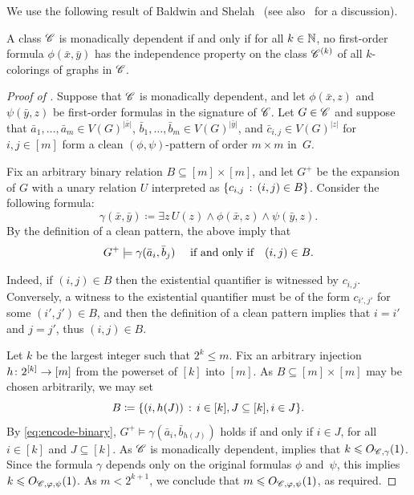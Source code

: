 We use the following result of Baldwin and Shelah~\cite[Theorem~8.1.8]{BS1985monadic} (see also~\cite[Theorem~2.58 and Proposition~2.65]{wojtekthesis} for a discussion).
\begin{theorem}\label{thm:bs}
A class $\mathscr C$ is monadically dependent if and only if 
for all $k\in\mathbb N$, no first-order formula $\phi(\bar x,\bar y)$ has the independence property on the class $\mathscr C^{(k)}$ of all $k$-colorings of graphs in $\mathscr C$.    
\end{theorem}

\begin{proof}[Proof of ]
    Suppose that $\mathscr C$ is monadically dependent, and let $\phi(\bar x,z)$ and $\psi(\bar y,z)$ be first-order formulas in the signature of $\mathscr C$.
     Let $G\in\mathscr C$ and suppose that $\bar a_1,\ldots,\bar a_m\in V(G)^{|\bar x|}$, $\bar b_1,\ldots,\bar b_m\in V(G)^{|\bar y|}$, and $\bar c_{i,j}\in V(G)^{|z|}$ for $i,j\in[m]$
       form a clean $(\phi,\psi)$-pattern of order $m\times m$ in~$G$.
    
    Fix an arbitrary binary relation $B\subseteq [m]\times [m]$,
and let $G^+$ be the expansion of $G$ with a unary relation $U$ 
interpreted as $\{c_{i,j} \,:\, (i,j)\in B \}$.
 Consider the following formula:
 $$\gamma(\bar x,\bar y)\coloneqq \exists z\, U(z)\land\phi(\bar x,z)\land \psi(\bar y,z).$$
 By the definition of a clean pattern, the above imply that
 \begin{align}\label{eq:encode-binary}
 G^+\models \gamma(\bar a_i,\bar b_j)\text{ \quad if and only if\quad} (i,j)\in B.   
 \end{align}

 Indeed, if $(i,j)\in B$ then the existential quantifier is witnessed by $c_{i,j}$.
 Conversely, a witness to the existential quantifier must be of the form $c_{i',j'}$ for some $(i',j')\in B$, and then the definition of a clean pattern implies that
 $i=i'$ and $j=j'$, thus $(i,j)\in B$.



Let $k$ be the largest integer such that $2^k\le m$. 
Fix an arbitrary injection $h\colon 2^{[k]}\to [m]$ from the powerset of $[k]$ into $[m]$.
As $B\subseteq[m]\times[m]$ may be chosen arbitrarily,
we may set $$B\coloneqq \{(i,h(J)) \,:\, i\in[k],J\subseteq [k],i\in J \}.$$
By \eqref{eq:encode-binary},
 $G^+\models\gamma(\bar a_i,\bar b_{h(J)})$ holds if and only if $i\in J$, for all $i\in[k]$ and $J\subseteq [k]$.
 As $\mathscr C$ is monadically dependent, 
  implies that $k\leqslant O_{\mathscr C,\gamma}(1)$.
Since the formula $\gamma$ depends only on the original formulas $\phi$ and~$\psi$, this implies $k\leqslant O_{\mathscr C,\varphi,\psi}(1)$. As $m< 2^{k+1}$, we conclude that $m\leqslant O_{\mathscr C,\varphi,\psi}(1)$, as required.
\end{proof}


